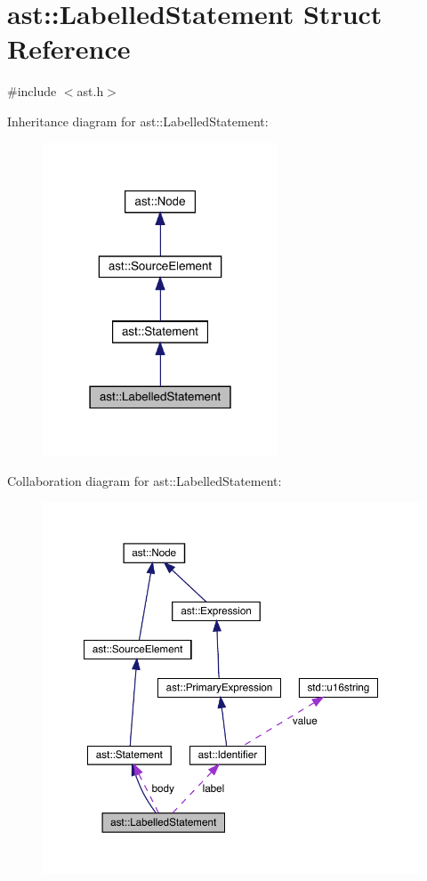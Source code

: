 \hypertarget{structast_1_1_labelled_statement}{}\section{ast\+:\+:Labelled\+Statement Struct Reference}
\label{structast_1_1_labelled_statement}


{\ttfamily \#include $<$ast.\+h$>$}



Inheritance diagram for ast\+:\+:Labelled\+Statement\+:\nopagebreak
\begin{figure}[H]
\begin{center}
\leavevmode
\includegraphics[width=198pt]{structast_1_1_labelled_statement__inherit__graph}
\end{center}
\end{figure}


Collaboration diagram for ast\+:\+:Labelled\+Statement\+:
\nopagebreak
\begin{figure}[H]
\begin{center}
\leavevmode
\includegraphics[width=350pt]{structast_1_1_labelled_statement__coll__graph}
\end{center}
\end{figure}
